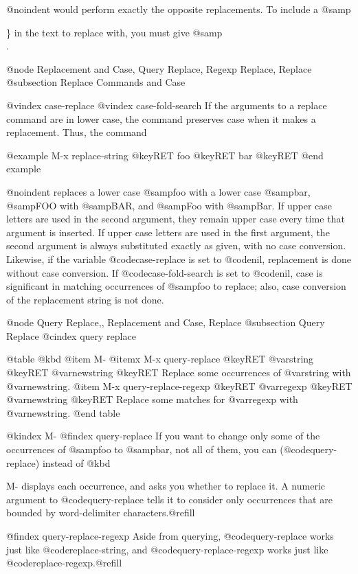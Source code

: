 {{{{{{{{{{{{{{@noindent
would perform exactly the opposite replacements.  To include a @samp{\}
in the text to replace with, you must give @samp{\\}.

@node Replacement and Case, Query Replace, Regexp Replace, Replace
@subsection Replace Commands and Case

@vindex case-replace
@vindex case-fold-search
  If the arguments to a replace command are in lower case, the command
preserves case when it makes a replacement.  Thus, the command

@example
M-x replace-string @key{RET} foo @key{RET} bar @key{RET}
@end example

@noindent
replaces a lower case @samp{foo} with a lower case @samp{bar}, @samp{FOO}
with @samp{BAR}, and @samp{Foo} with @samp{Bar}.  If upper case letters are
used in the second argument, they remain upper case every time that
argument is inserted.  If upper case letters are used in the first
argument, the second argument is always substituted exactly as given, with
no case conversion.  Likewise, if the variable @code{case-replace} is set
to @code{nil}, replacement is done without case conversion.  If
@code{case-fold-search} is set to @code{nil}, case is significant in
matching occurrences of @samp{foo} to replace; also, case conversion of the
replacement string is not done.

@node Query Replace,, Replacement and Case, Replace
@subsection Query Replace
@cindex query replace

@table @kbd
@item M-%
@itemx M-x query-replace @key{RET} @var{string} @key{RET} @var{newstring} @key{RET}
Replace some occurrences of @var{string} with @var{newstring}.
@item M-x query-replace-regexp @key{RET} @var{regexp} @key{RET} @var{newstring} @key{RET}
Replace some matches for @var{regexp} with @var{newstring}.
@end table

@kindex M-%
@findex query-replace
  If you want to change only some of the occurrences of @samp{foo} to
@samp{bar}, not all of them, you can (@code{query-replace}) instead of
@kbd{M-%
displays each occurrence, and asks you whether to replace it.  A numeric
argument to @code{query-replace} tells it to consider only occurrences
that are bounded by word-delimiter characters.@refill

@findex query-replace-regexp
  Aside from querying, @code{query-replace} works just like
@code{replace-string}, and @code{query-replace-regexp} works
just like @code{replace-regexp}.@refill

}}}}}}}}}}}}}}}}
